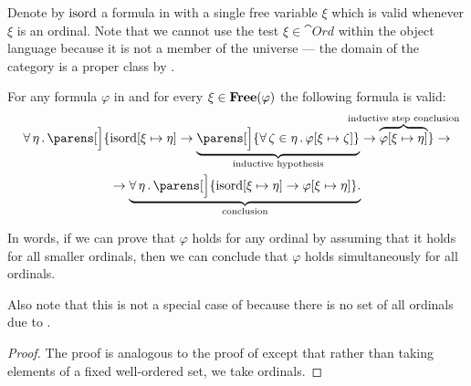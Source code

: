 \begin{theorem}\label{thm:transfinite_induction}
  Denote by \( \operatorname{isord} \) a formula in \hyperref[def:zfc]{} with a single free variable \( \xi \) which is valid whenever \( \xi \) is an ordinal. Note that we cannot use the test \( \xi \in \cat{Ord} \) within the object language because it is not a member of the universe --- the domain of the category is a proper class by .

  For any formula \( \varphi \) in  and for every \( \xi \in \operatorname{\mathbf{Free}}(\varphi) \) the following formula is valid:
  \begin{multline}\label{eq:def:transfinite_induction}
    \qforall \eta \parens[\Big]
      {
        \op{isord}[\xi \mapsto \eta] \rightarrow
          \underbrace
            {
              \parens[\Big] { \qforall {\zeta \in \eta} \varphi[\xi \mapsto \zeta] }
            }_{\T{inductive hypothesis}}
        \rightarrow
        \overbrace{ \varphi[\xi \mapsto \eta] }^{\mathclap{\T{inductive step conclusion}}}
      }
    \rightarrow \\ \rightarrow
    \underbrace
      {
        \qforall \eta \parens[\Big] { \op{isord}[\xi \mapsto \eta] \rightarrow \varphi[\xi \mapsto \eta] }.
      }_{\T{conclusion}}
  \end{multline}

  In words, if we can prove that \( \varphi \) holds for any ordinal by assuming that it holds for all smaller ordinals, then we can conclude that \( \varphi \) holds simultaneously for all ordinals.

  Also note that this is not a special case of  because there is no set of all ordinals due to .
\end{theorem}
\begin{proof}
  The proof is analogous to the proof of  except that rather than taking elements of a fixed well-ordered set, we take ordinals.
\end{proof}

\begin{theorem}\label{thm:transfinite_recursion}
\end{theorem}

